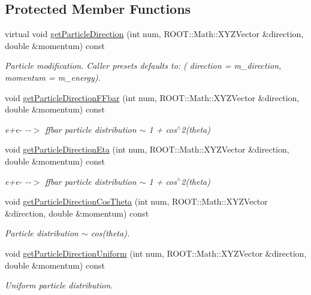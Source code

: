 \subsection*{Protected Member Functions}
\begin{DoxyCompactItemize}
\item 
virtual void \hyperlink{class_d_d4hep_1_1_simulation_1_1_geant4_isotrope_generator_af4fcebcc7a5e4c13a458200d03b07f33}{getParticleDirection} (int num, ROOT::Math::XYZVector \&direction, double \&momentum) const 
\begin{DoxyCompactList}\small\item\em Particle modification. Caller presets defaults to: ( direction = m\_\-direction, momentum = m\_\-energy). \item\end{DoxyCompactList}\item 
void \hyperlink{class_d_d4hep_1_1_simulation_1_1_geant4_isotrope_generator_a40e412ab8c1a342416dfbf98762d6190}{getParticleDirectionFFbar} (int num, ROOT::Math::XYZVector \&direction, double \&momentum) const 
\begin{DoxyCompactList}\small\item\em e+e-\/ -\/-\/$>$ ffbar particle distribution $\sim$ 1 + cos$^\wedge$2(theta) \item\end{DoxyCompactList}\item 
void \hyperlink{class_d_d4hep_1_1_simulation_1_1_geant4_isotrope_generator_aa93baab476bd121730d9a51a3fd02eac}{getParticleDirectionEta} (int num, ROOT::Math::XYZVector \&direction, double \&momentum) const 
\begin{DoxyCompactList}\small\item\em e+e-\/ -\/-\/$>$ ffbar particle distribution $\sim$ 1 + cos$^\wedge$2(theta) \item\end{DoxyCompactList}\item 
void \hyperlink{class_d_d4hep_1_1_simulation_1_1_geant4_isotrope_generator_a65335e157f828238e0e9f30fcd3dc0d8}{getParticleDirectionCosTheta} (int num, ROOT::Math::XYZVector \&direction, double \&momentum) const 
\begin{DoxyCompactList}\small\item\em Particle distribution $\sim$ cos(theta). \item\end{DoxyCompactList}\item 
void \hyperlink{class_d_d4hep_1_1_simulation_1_1_geant4_isotrope_generator_a77eadd30ad9d62796bcd5abab9e8e1d8}{getParticleDirectionUniform} (int num, ROOT::Math::XYZVector \&direction, double \&momentum) const 
\begin{DoxyCompactList}\small\item\em Uniform particle distribution. \item\end{DoxyCompactList}\end{DoxyCompactItemize}
